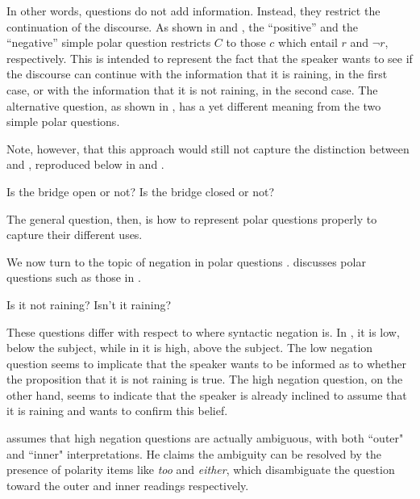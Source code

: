 \documentclass[output=paper,colorlinks,citecolor=brown]{langscibook}
\begin{document}
In other words, questions do not add information. Instead, they restrict the continuation of the discourse. As shown in  and , the ``positive'' and the ``negative'' simple polar question restricts $C$ to those $c$ which entail $r$ and $\neg r$, respectively. This is intended to represent the fact that the speaker wants to see if the discourse can continue with the information that it is raining, in the first case, or with the information that it is not raining, in the second case. The alternative question, as shown in , has a yet different meaning from the two simple polar questions.  

Note, however, that this approach would still not capture the distinction between  and , reproduced below in  and .

\ea\label{openornot2}
Is the bridge open or not?
\ex\label{closedornot2}
Is the bridge closed or not?
\z

The general question, then, is how to represent polar questions properly to capture their different uses.

We now turn to the topic of negation in polar questions \citep{bolinger1957interrogative, Ladusaw:1979, Ladd:1981}. \citet{Ladd:1981} discusses polar questions such as those in . 

\begin{exe}\label{negationquestions}
\ex\label{lownegation} 
Is it not raining?
\ex\label{highnegation}
Isn't it raining?
\end{exe}

These questions differ with respect to where syntactic negation is. In , it is low, below the subject, while in  it is high, above the subject. The low negation question seems to implicate that the speaker wants to be informed as to whether the proposition that it is not raining is true. The high negation question, on the other hand, seems to indicate that the speaker is already inclined to assume that it is raining and wants to confirm this belief.

\citet{Ladd:1981} assumes that high negation questions are actually ambiguous, with both ``outer" and ``inner" interpretations. %
He claims the ambiguity can be resolved by the presence of polarity items like \textit{too} and \textit{either}, which disambiguate the question toward the outer and inner readings respectively. %
\end{document}
